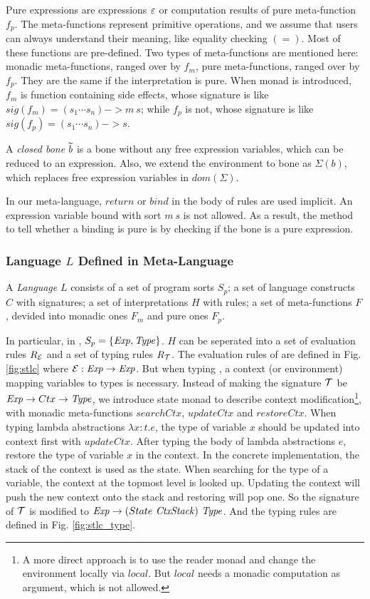 Pure expressions are expressions $\varepsilon$ or computation results of pure meta-function $f_p$.
The meta-functions represent primitive operations, and we assume that users can always understand their meaning, like equality checking $(=)$.
Most of these functions are pre-defined.
Two types of meta-functions are mentioned here:
 monadic meta-functions, ranged over by $f_m$,
 pure meta-functions, ranged over by $f_p$.
They are the same if the interpretation is pure.
When monad is introduced,
 $f_m$ is function containing side effects, 
  whose signature is like $sig(f_m)=(s_1\cdots s_n)->m~s$;
 while $f_p$ is not,
  whose signature is like $sig(f_p)=(s_1\cdots s_n)->s$.

A \textit{closed bone} $\widetilde{b}$ is a bone without any free expression variables,
 which can be reduced to an expression.
Also, we extend the environment to bone as $Σ(b)$, which replaces free expression variables in $dom(Σ)$.

In our meta-language, $\mathit{return}$ or $\mathit{bind}$ in the body of rules are used implicit.
An expression variable bound with sort $m~s$ is not allowed.
As a result, the method to tell whether a binding is pure is by checking if the bone is a pure expression.

\subsubsection{Language $L$ Defined in Meta-Language}
A \textit{Language} $L$ consists of a set of program sorts $S_p$;
 a set of language constructs $C$ with signatures;
 a set of interpretations $H$ with rules;
 a set of meta-functions $F$, devided into monadic ones $F_m$ and pure ones $F_p$.

In particular, in \STLC{}, $S_p=\{\mathit{Exp},\mathit{Type}\}$.
$H$ can be seperated into a set of evaluation rules $R_{\mathcal{E}}$ and a set of typing rules $R_{\mathcal{T}}$.
The evaluation rules of \STLC{} are defined in Fig. \ref{fig:stlc} where $\mathcal{E}:\mathit{Exp}->\mathit{Exp}$.
But when typing \STLC, a context (or environment) mapping variables to types is necessary.
Instead of making the signature $\mathcal{T}$ be $\mathit{Exp} -> Ctx -> \mathit{Type}$,
 we introduce state monad to describe context modification\footnote{
  A more direct approach is to use the reader monad and change the environment locally via $\mathit{local}$.
  But $\mathit{local}$ needs a monadic computation as argument, which is not allowed.
 },
 with monadic meta-functions $searchCtx$, $updateCtx$ and $restoreCtx$.
When typing lambda abstractions $λx:t.e$, the type of variable $x$ should be updated into context first with $updateCtx$.
After typing the body of lambda abstractions $e$, restore the type of variable $x$ in the context.
In the concrete implementation, the stack of the context is used as the state.
When searching for the type of a variable, the context at the topmost level is looked up.
Updating the context will push the new context onto the stack and restoring will pop one.
So the signature of $\mathcal{T}$ is modified to $\mathit{Exp} -> (State~\mathit{CtxStack})~\mathit{Type}$.
And the typing rules are defined in Fig. \ref{fig:stlc_type}.

